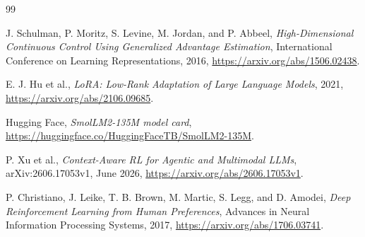 \documentclass{strategynet-journal}
\begin{document}
\begin{thebibliography}{99}

J. Schulman, P. Moritz, S. Levine, M. Jordan, and P. Abbeel,
\emph{High-Dimensional Continuous Control Using Generalized Advantage
Estimation},
International Conference on Learning Representations, 2016,
\url{https://arxiv.org/abs/1506.02438}.

E. J. Hu et al.,
\emph{LoRA: Low-Rank Adaptation of Large Language Models}, 2021,
\url{https://arxiv.org/abs/2106.09685}.

Hugging Face,
\emph{SmolLM2-135M model card},
\url{https://huggingface.co/HuggingFaceTB/SmolLM2-135M}.

P. Xu et al.,
\emph{Context-Aware RL for Agentic and Multimodal LLMs},
arXiv:2606.17053v1, June 2026,
\url{https://arxiv.org/abs/2606.17053v1}.

P. Christiano, J. Leike, T. B. Brown, M. Martic, S. Legg, and D. Amodei,
\emph{Deep Reinforcement Learning from Human Preferences},
Advances in Neural Information Processing Systems, 2017,
\url{https://arxiv.org/abs/1706.03741}.



\end{thebibliography}
\end{document}
